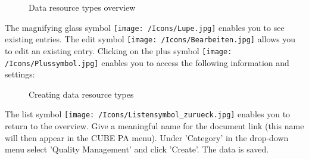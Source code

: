 \begin{figure}[H]
\caption{Data resource types overview}
\end{figure}

The magnifying glass symbol \texttt{[image: /Icons/Lupe.jpg]}  enables you to see existing entries. The edit symbol \texttt{[image: /Icons/Bearbeiten.jpg]}  allows you to edit an existing entry. Clicking on the plus symbol \texttt{[image: /Icons/Plussymbol.jpg]}  enables you to access the following information and settings:

\begin{figure}[H]
\caption{Creating data resource types}
\end{figure}

The list symbol \texttt{[image: /Icons/Listensymbol\_zurueck.jpg]}  enables you to return to the overview. Give a meaningful name for the document link  (this name will then appear in the CUBE PA menu). Under 'Category'  in the drop-down menu select 'Quality Management' and click 'Create'. The data is saved.

\vspace{\baselineskip}

